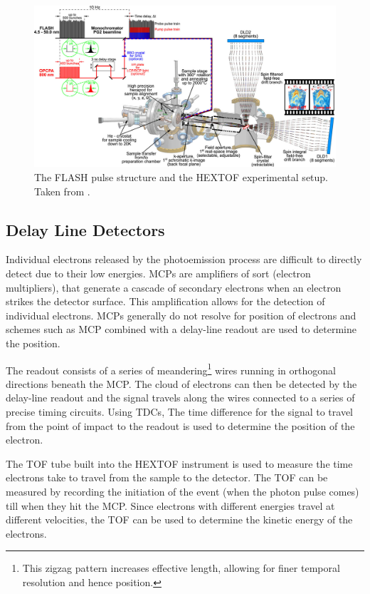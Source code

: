 \begin{figure}
    \centering
    \includegraphics[width=1\linewidth]{images/2024-08-27-10-50-01.png}
    \caption{The \gls{FLASH} pulse structure and the \gls{HEXTOF} experimental setup. Taken from \cite{kutnyakhovTimeMomentumresolvedPhotoemission2020}.}
    \label{fig:hex-tof}
\end{figure}


\subsection{Delay Line Detectors}
Individual electrons released by the photoemission process are difficult to directly detect due to their low energies. \Glspl{MCP} are amplifiers of sort (electron multipliers), that generate a cascade of secondary electrons when an electron strikes the detector surface. This amplification allows for the detection of individual electrons. \Glspl{MCP} generally do not resolve for position of electrons and schemes such as \gls{MCP} combined with a delay-line readout are used to determine the position. 

The readout consists of a series of meandering\footnote{This zigzag pattern increases effective length, allowing for finer temporal resolution and hence position.} wires running in orthogonal directions beneath the \gls{MCP}. The cloud of electrons can then be detected by the delay-line readout and the signal travels along the wires connected to a series of precise timing circuits. Using \glspl{TDC}, The time difference for the signal to travel from the point of impact to the readout is used to determine the position of the electron.


The \gls{TOF} tube built into the \gls{HEXTOF} instrument is used to measure the time electrons take to travel from the sample to the detector. The \gls{TOF} can be measured by recording the initiation of the event (when the photon pulse comes) till when they hit the \gls{MCP}. Since electrons with different energies travel at different velocities, the \gls{TOF} can be used to determine the kinetic energy of the electrons. 

